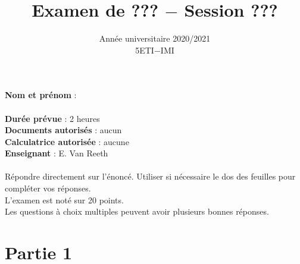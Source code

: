 \documentclass[12pt]{article}
\begin{document}
%
\title{Examen de ??? $-$ Session ???}
\date{Année universitaire 2020/2021\\5ETI$-$IMI}
\maketitle
\thispagestyle{fancy}	
\noindent
\textbf{Nom et prénom} : \hrulefill \\\\
\textbf{Durée prévue} : 2 heures\\
\textbf{Documents autorisés} : aucun\\
\textbf{Calculatrice autorisée} : aucune\\
\textbf{Enseignant} : E. Van Reeth\\
\\
%
\noindent
Répondre directement sur l'énoncé. 
Utiliser si nécessaire le dos des feuilles pour compléter vos réponses.\\
L'examen est noté sur 20 points.\\
Les questions à choix multiples peuvent avoir plusieurs bonnes réponses.
\newpage
%
%
%
\section*{Partie 1}
\end{document}
